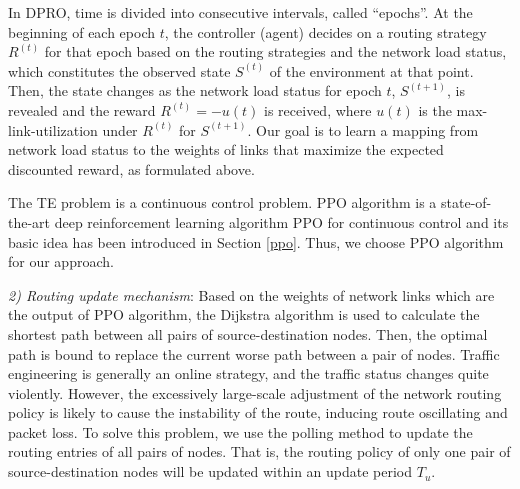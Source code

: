 \documentclass[10pt,conference]{IEEEtran}
\begin{document}
In DPRO, time is divided into consecutive intervals, called ``epochs''. At the beginning of each epoch $t$, the controller (agent) decides on a routing strategy $R^{(t)}$ for that epoch based on the routing strategies and the network load status, which constitutes the observed state $S^{(t)}$ of the environment at that point. Then, the state changes as the network load status for epoch $t$, $S^{(t+1)}$, is revealed and the reward $R^{(t)}=-u(t)$ is received, where $u(t)$ is the max-link-utilization under $R^{(t)}$ for $S^{(t+1)}$. Our goal is to learn a mapping from network load status to the weights of links that maximize the expected discounted reward, as formulated above.

The TE problem is a continuous control problem. PPO algorithm is a state-of-the-art deep reinforcement learning algorithm PPO\cite{ppo2017} for continuous control and its basic idea has been introduced in Section \ref{ppo}. Thus, we choose PPO\cite{ppo2017} algorithm for our approach.

\emph{2) Routing update mechanism}: Based on the weights of network links which are the output of PPO algorithm, the Dijkstra algorithm is used to calculate the shortest path between all pairs of source-destination nodes. Then, the optimal path is bound to replace the current worse path between a pair of nodes. Traffic engineering is generally an online strategy, and the traffic status changes quite violently. However, the excessively large-scale adjustment of the network routing policy is likely to cause the instability of the route, inducing route oscillating and packet loss. To solve this problem, we use the polling method to update the routing entries of all pairs of nodes. That is, the routing policy of only one pair of source-destination nodes will be updated within an update period $T_u$.

\end{document}
